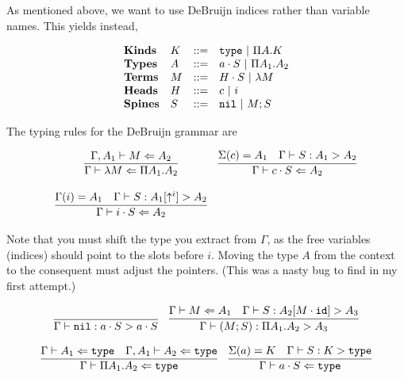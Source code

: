 \documentclass[11pt,twoside]{article}
\begin{document}
As mentioned above, we want to use DeBruijn indices rather
than variable names.  This yields instead,

\renewcommand{\PiTyp}[2]{\Pi #1.#2}
\renewcommand{\Lam}[1]{\lambda #1}

$$
\begin{array}{llll}
\mathbf{Kinds} & K & ::= & \Type \Spb \PiTyp{A}{K} \\
\mathbf{Types} & A & ::= & a\cdot S \Spb \PiTyp{A_1}{A_2} \\
\mathbf{Terms} & M & ::= & H\cdot S \Spb \Lam{M} \\
\mathbf{Heads} & H & ::= & c \Spb i\\
\mathbf{Spines} & S & ::= & \Nil \Spb M;S\\
\end{array} 
$$

The typing rules for the DeBruijn grammar are

\newcommand{\CheckTy}[3][\Gamma]{#1\vdash #2 \Leftarrow #3}
\newcommand{\Focus}[4][\Gamma]{#1\vdash #2 : #3 > #4}

\bigskip 
\framebox{$\CheckTy{M}{A}$}
\bigskip 

$$
\begin{array}{cc}
\infer{\CheckTy{\Lam{M}}{\PiTyp{A_1}{A_2}}}{\CheckTy[\Gamma,A_1]{M}{A_2}} &
\infer{\CheckTy{c\cdot S}{A_2}}{\Sigma(c)=A_1 & \Focus{S}{A_1}{A_2}} \\\\
\infer{\CheckTy{i\cdot S}{A_2}}{\Gamma(i)=A_1 & \Focus{S}{A_1[\Shift^i]}{A_2}}
\end{array} 
$$

Note that you must shift the type you extract from $\Gamma$, as the
free variables (indices) should point to the slots before $i$.  Moving
the type $A$ from the context to the consequent must adjust the pointers.
(This was a nasty bug to find in my first attempt.)

\bigskip 
\framebox{$\Focus{S}{A_1}{A_2}$}
\bigskip 

$$
\begin{array}{lr}
\infer{\Focus{\Nil}{a\cdot S}{a\cdot S}}{} & 
\infer{\Focus{(M;S)}{\PiTyp{A_1}{A_2}}{A_3}}{\CheckTy{M}{A_1} & \Focus{S}{A_2[M\cdot\IdSub]}{A_3}}
\end{array} 
$$

\bigskip 
\framebox{$\CheckTy{A}{\Type}$}
\bigskip 

$$
\begin{array}{cc}
\infer{\CheckTy{\PiTyp{A_1}{A_2}}{\Type}}{\CheckTy{A_1}{\Type} & \CheckTy[\Gamma,A_1]{A_2}{\Type}} &
\infer{\CheckTy{a\cdot S}{\Type}}{\Sigma(a) = K & \Focus{S}{K}{\Type}}
\end{array} 
$$
\end{document}
